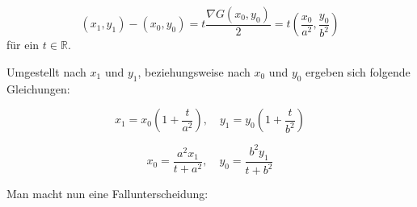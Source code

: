 \begin{equation}
	(x_1,y_1) - (x_0, y_0) = t\frac{\nabla G(x_0,y_0)}{2} = t\left(\frac{x_0}{a^2},\frac{y_0}{b^2}\right)
\end{equation}
für ein $t\in\mathbb{R}$.

Umgestellt nach $x_1$ und $y_1$, beziehungsweise nach $x_0$ und $y_0$ ergeben sich folgende Gleichungen:

\begin{equation}\label{eq:ellipseDistY}
x_1 = x_0\left(1 + \frac{t}{a^2}\right), \quad y_1 = y_0\left(1 + \frac{t}{b^2}\right)
\end{equation}

\begin{equation}\label{eq:ellipseDistX}
x_0 = \frac{a^2x_1}{t+a^2},\quad y_0 = \frac{b^2y_1}{t+b^2}
\end{equation}


\bigskip
Man macht nun eine Fallunterscheidung:

